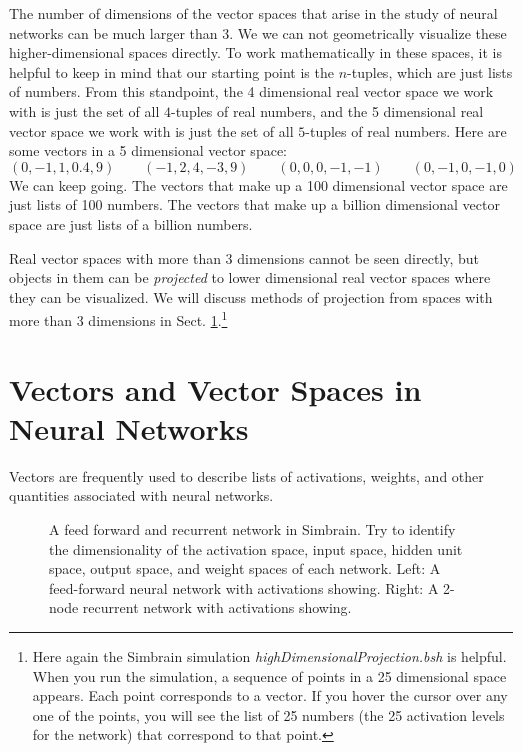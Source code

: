    The number of dimensions of the vector spaces that arise in the study of 
neural networks can be much larger than 3. We we can not geometrically visualize these higher-dimensional spaces directly. To work mathematically in 
these spaces, it is helpful to keep in mind that our starting point is the 
$n$-tuples, which are just lists of numbers. From this standpoint, the 4 
dimensional real vector space we work with is just the set of all $4$-tuples of
real numbers, and the 5 dimensional real vector space we work with is just the 
set of all $5$-tuples of real numbers. Here are some vectors in a 5 
dimensional vector space:
\begin{equation*}
    (0,-1, 1, 0.4, 9)  \qquad
    (-1, 2, 4, -3, 9)  \qquad 
    (0, 0, 0, -1, -1 ) \qquad
    (0, -1, 0, -1, 0 ) 
\end{equation*}
We can keep going. The vectors that make up a 100 dimensional vector space are 
just lists of 100 numbers. The vectors that make up a billion dimensional 
vector space are just lists of a billion numbers. 

   Real vector spaces with more than 3 dimensions cannot be seen directly, but 
objects in them can be \emph{projected} to lower dimensional real vector spaces 
where they can be visualized. We will discuss methods of projection from 
spaces with more than 3 dimensions in Sect. \ref{S:dimReduction}.\footnote{Here
again the Simbrain simulation \emph{highDimensionalProjection.bsh} is helpful.
When you run the simulation, a sequence of points in a 25 dimensional space 
appears. Each point corresponds to a vector. If you hover the cursor over any
one of the points, you will see the list of 25 numbers (the 25 activation levels
for the network) that correspond to that point.}

\section{Vectors and Vector Spaces in Neural Networks}\label{S:dimReduction}

   Vectors are frequently used to describe lists of activations, weights, and other quantities associated with neural networks. 

\begin{figure}[h]
\centering
{}
\hspace*{1in}
\caption[Simbrain screenshots.]{A feed forward and recurrent network in Simbrain. Try to identify the dimensionality of the activation space, input space, hidden unit space, output space, and weight spaces of each network. Left: A feed-forward neural network with activations showing. Right: A 2-node recurrent network with activations showing.}
\label{ffRecurrent}
\end{figure}

